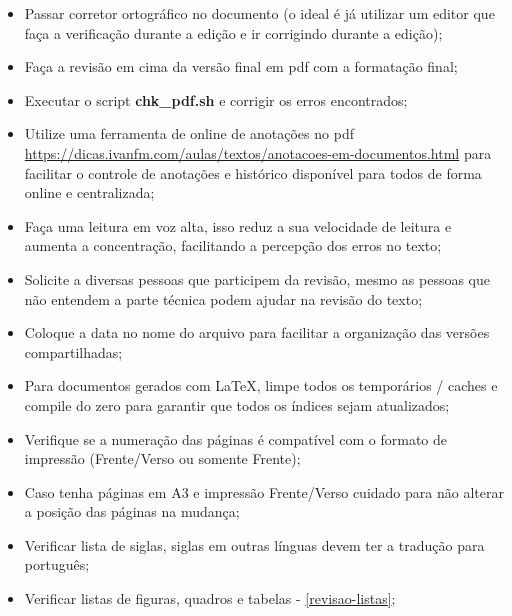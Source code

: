 \begin{itemize}
    \item Passar corretor ortográfico no documento (o ideal é já utilizar um editor que faça a verificação durante a edição e ir corrigindo durante a edição);

    \item Faça a revisão em cima da versão final em \ac{pdf} com a formatação final;
    
    \item Executar o script \textbf{chk\_pdf.sh} e corrigir os erros encontrados;
    
    \item Utilize uma ferramenta de online de anotações no \ac{pdf} \url{https://dicas.ivanfm.com/aulas/textos/anotacoes-em-documentos.html} para facilitar o controle de anotações e histórico disponível para todos de forma online e centralizada;
    
    \item Faça uma leitura em voz alta, isso reduz a sua velocidade de leitura e aumenta a concentração, facilitando a percepção dos erros no texto;
    
    \item Solicite a diversas pessoas que participem da revisão, mesmo as pessoas que não entendem a parte técnica podem ajudar na revisão do texto;
    
    \item Coloque a data no nome do arquivo para facilitar a organização das versões compartilhadas;
    
    \item Para documentos gerados com \LaTeX, limpe todos os temporários / caches e compile do zero para garantir que todos os índices sejam atualizados;
    
    \item Verifique se a numeração das páginas é compatível com o formato de impressão (Frente/Verso ou somente Frente);
    
    \item Caso tenha páginas em A3 e impressão Frente/Verso cuidado para não alterar a posição das páginas na mudança;
    
    \item Verificar lista de siglas, siglas em outras línguas devem ter a tradução para português;

    \item Verificar listas de figuras, quadros e tabelas - \autoref{revisao-listas};


\end{itemize}

